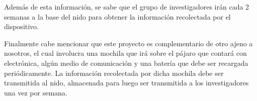 Además de esta información, se sabe que el grupo de investigadores irán cada 2 semanas a la base del nido para obtener la información recolectada por el dispositivo.

Finalmente cabe mencionar que este proyecto es complementario de otro ajeno a nosotros, el cual involucra una mochila que irá sobre el pájaro que contará con electrónica, algún medio de comunicación y una batería que debe ser recargada periódicamente.
La información recolectada por dicha mochila debe ser transmitida al nido, almacenada para luego ser transmitida a los investigadores una vez por semana.

%